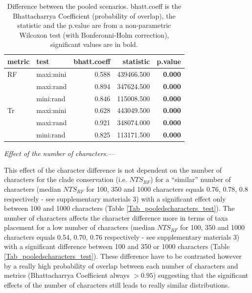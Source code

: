 \documentclass[12pt,letterpaper]{article}
\renewcommand{\subsubsection}[1]{%
\vspace{2ex}
\noindent
\textit{#1.}---}
\begin{document}
\begin{table}[ht]
\centering
\begin{tabular}{ll|r|rr}
  \hline
metric & test & bhatt.coeff & statistic & p.value \\ 
  \hline
RF & maxi:mini & 0.588 & 439466.500 & \textbf{0.000} \\ 
   & maxi:rand & 0.894 & 347624.500 & \textbf{0.000} \\ 
   & mini:rand & 0.846 & 115008.500 & \textbf{0.000} \\ 
Tr & maxi:mini & 0.628 & 443049.500 & \textbf{0.000} \\ 
   & maxi:rand & 0.921 & 348074.000 & \textbf{0.000} \\ 
   & mini:rand & 0.825 & 113171.500 & \textbf{0.000} \\ 
   \hline
\end{tabular}
\caption{Difference between the pooled scenarios. bhatt.coeff is the Bhattacharrya Coefficient (probability of overlap), the statistic and the p.value are from a non-parametric Wilcoxon test (with Bonferonni-Holm correction), significant values are in bold.} 
\label{Tab_pooledscenarios_test}
\end{table}

\subsubsection{Effect of the number of characters}

This effect of the character difference is not dependent on the number of characters for the clade conservation (i.e. $NTS_{RF}$) for a ``similar'' number of characters (median $NTS_{RF}$ for 100, 350 and 1000 characters equals 0.76, 0.78, 0.8 respectively - see supplementary materials 3) with a significant effect only between 100 and 1000 characters (Table \ref{Tab_pooledscharacters_test}).
The number of characters affects the character difference more in terms of taxa placement for a low number of characters (median $NTS_{RF}$ for 100, 350 and 1000 characters equals 0.54, 0.70, 0.76 respectively - see supplementary materials 3) with a significant difference between 100 and 350 or 1000 characters (Table \ref{Tab_pooledscharacters_test}).
These difference have to be contrasted however by a really high probability of overlap between each number of characters and metrics (Bhattacharrya Coefficient always $>0.95$) suggesting that the significant effects of the number of characters still leads to really similar distributions.
\end{document}
